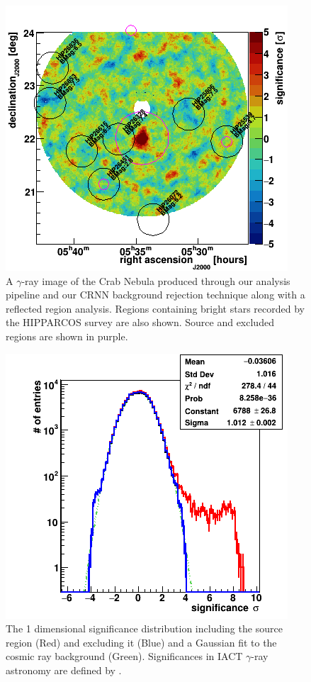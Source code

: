 \begin{figure}[] 
        \centering \includegraphics[width=\columnwidth]{figures/skysig.png}

        \caption{
                \label{fig:skysig} A $\gamma$-ray image of the Crab Nebula produced through our analysis pipeline and our CRNN background rejection technique along with a reflected region analysis. Regions containing bright stars recorded by the HIPPARCOS survey are also shown. Source and excluded regions are shown in purple.
        }
\end{figure}
\begin{figure}[] 
        \centering \includegraphics[width=0.5\columnwidth]{figures/sig1d.png}

        \caption{
                \label{fig:sig1D} The 1 dimensional significance distribution including the source region (Red) and excluding it (Blue) and a Gaussian fit to the cosmic ray background (Green). Significances in IACT $\gamma$-ray astronomy are defined by \cite{LiMa}.
        }
\end{figure}

